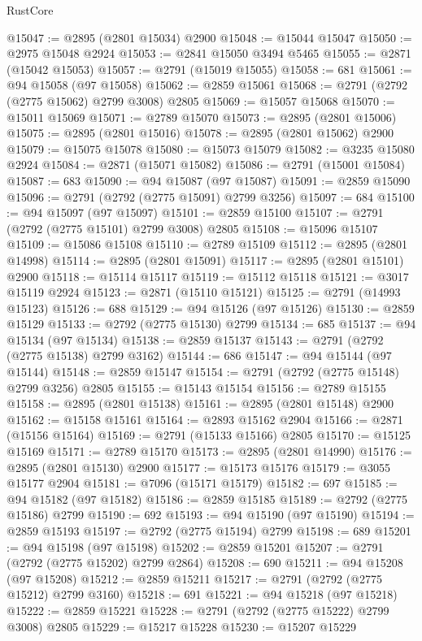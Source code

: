 \begin{lexlean}{RustCore}
\begin{coremodule}
@15047 := @2895 (@2801 @15034) @2900
@15048 := @15044 @15047
@15050 := @2975 @15048 @2924
@15053 := @2841 @15050 @3494 @5465
@15055 := @2871 (@15042 @15053)
@15057 := @2791 (@15019 @15055)
@15058 := 681
@15061 := @94 @15058 (@97 @15058)
@15062 := @2859 @15061
@15068 := @2791 (@2792 (@2775 @15062) @2799 @3008) @2805
@15069 := @15057 @15068
@15070 := @15011 @15069
@15071 := @2789 @15070
@15073 := @2895 (@2801 @15006)
@15075 := @2895 (@2801 @15016)
@15078 := @2895 (@2801 @15062) @2900
@15079 := @15075 @15078
@15080 := @15073 @15079
@15082 := @3235 @15080 @2924
@15084 := @2871 (@15071 @15082)
@15086 := @2791 (@15001 @15084)
@15087 := 683
@15090 := @94 @15087 (@97 @15087)
@15091 := @2859 @15090
@15096 := @2791 (@2792 (@2775 @15091) @2799 @3256)
@15097 := 684
@15100 := @94 @15097 (@97 @15097)
@15101 := @2859 @15100
@15107 := @2791 (@2792 (@2775 @15101) @2799 @3008) @2805
@15108 := @15096 @15107
@15109 := @15086 @15108
@15110 := @2789 @15109
@15112 := @2895 (@2801 @14998)
@15114 := @2895 (@2801 @15091)
@15117 := @2895 (@2801 @15101) @2900
@15118 := @15114 @15117
@15119 := @15112 @15118
@15121 := @3017 @15119 @2924
@15123 := @2871 (@15110 @15121)
@15125 := @2791 (@14993 @15123)
@15126 := 688
@15129 := @94 @15126 (@97 @15126)
@15130 := @2859 @15129
@15133 := @2792 (@2775 @15130) @2799
@15134 := 685
@15137 := @94 @15134 (@97 @15134)
@15138 := @2859 @15137
@15143 := @2791 (@2792 (@2775 @15138) @2799 @3162)
@15144 := 686
@15147 := @94 @15144 (@97 @15144)
@15148 := @2859 @15147
@15154 := @2791 (@2792 (@2775 @15148) @2799 @3256) @2805
@15155 := @15143 @15154
@15156 := @2789 @15155
@15158 := @2895 (@2801 @15138)
@15161 := @2895 (@2801 @15148) @2900
@15162 := @15158 @15161
@15164 := @2893 @15162 @2904
@15166 := @2871 (@15156 @15164)
@15169 := @2791 (@15133 @15166) @2805
@15170 := @15125 @15169
@15171 := @2789 @15170
@15173 := @2895 (@2801 @14990)
@15176 := @2895 (@2801 @15130) @2900
@15177 := @15173 @15176
@15179 := @3055 @15177 @2904
@15181 := @7096 (@15171 @15179)
@15182 := 697
@15185 := @94 @15182 (@97 @15182)
@15186 := @2859 @15185
@15189 := @2792 (@2775 @15186) @2799
@15190 := 692
@15193 := @94 @15190 (@97 @15190)
@15194 := @2859 @15193
@15197 := @2792 (@2775 @15194) @2799
@15198 := 689
@15201 := @94 @15198 (@97 @15198)
@15202 := @2859 @15201
@15207 := @2791 (@2792 (@2775 @15202) @2799 @2864)
@15208 := 690
@15211 := @94 @15208 (@97 @15208)
@15212 := @2859 @15211
@15217 := @2791 (@2792 (@2775 @15212) @2799 @3160)
@15218 := 691
@15221 := @94 @15218 (@97 @15218)
@15222 := @2859 @15221
@15228 := @2791 (@2792 (@2775 @15222) @2799 @3008) @2805
@15229 := @15217 @15228
@15230 := @15207 @15229

\end{coremodule}
\end{lexlean}
